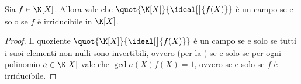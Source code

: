 \begin{corollary}
    Sia $f \in \K[X]$. Allora vale che $\quot{\K[X]}{\ideal[\big]{f(X)}}$ è un campo se e solo se $f$ è irriducibile in $\K[X]$.
\end{corollary}
\begin{proof}
    Il quoziente $\quot{\K[X]}{\ideal[\big]{f(X)}}$ è un campo se e solo se tutti i suoi elementi non nulli sono invertibili, ovvero (per la ) se e solo se per ogni polinomio $a \in \K[X]$ vale che $\gcd{a(X)}{f(X)} = 1$, ovvero se e solo se $f$ è irriducibile.
\end{proof}